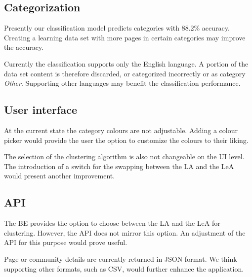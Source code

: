 \subsection{Categorization}

Presently our classification model predicts categories with 88.2\% accuracy. Creating a learning data set with more pages in certain categories may improve the accuracy. 

Currently the classification supports only the English language. A portion of the data set content is therefore discarded, or categorized incorrectly or as category \textit{Other}. Supporting other languages may benefit the classification performance. 

\subsection{User interface}

At the current state the category colours are not adjustable. Adding a colour picker would provide the user the option to customize the colours to their liking.

The selection of the clustering algorithm is also not changeable on the UI level. The introduction of a switch for the swapping between the LA and the LeA would present another improvement.
\subsection{API}

The BE provides the option to choose between the LA and the LeA for clustering. However, the API does not mirror this option. An adjustment of the API for this purpose would prove useful. 

Page or community details are currently returned in JSON format. We think supporting other formats, such as CSV, would further enhance the application.
